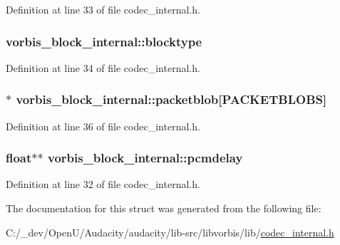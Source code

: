 Definition at line 33 of file codec\+\_\+internal.\+h.

\subsubsection[{\texorpdfstring{blocktype}{blocktype}}]{ vorbis\+\_\+block\+\_\+internal\+::blocktype}\hypertarget{structvorbis__block__internal_a4e3ca80a917072fbbe17dd5bd23f96ed}{}\label{structvorbis__block__internal_a4e3ca80a917072fbbe17dd5bd23f96ed}


Definition at line 34 of file codec\+\_\+internal.\+h.

\subsubsection[{\texorpdfstring{packetblob}{packetblob}}]{$\ast$ vorbis\+\_\+block\+\_\+internal\+::packetblob\mbox{[}{\bf P\+A\+C\+K\+E\+T\+B\+L\+O\+BS}\mbox{]}}\hypertarget{structvorbis__block__internal_a7b98d48f2d7a3305005d0513a7698218}{}\label{structvorbis__block__internal_a7b98d48f2d7a3305005d0513a7698218}


Definition at line 36 of file codec\+\_\+internal.\+h.

\subsubsection[{\texorpdfstring{pcmdelay}{pcmdelay}}]{\setlength{\rightskip}{0pt plus 5cm}float$\ast$$\ast$ vorbis\+\_\+block\+\_\+internal\+::pcmdelay}\hypertarget{structvorbis__block__internal_a6a650f039d0b3c0b320c8bf5e198547a}{}\label{structvorbis__block__internal_a6a650f039d0b3c0b320c8bf5e198547a}


Definition at line 32 of file codec\+\_\+internal.\+h.



The documentation for this struct was generated from the following file\+:\begin{DoxyCompactItemize}
\item 
C\+:/\+\_\+dev/\+Open\+U/\+Audacity/audacity/lib-\/src/libvorbis/lib/\hyperlink{codec__internal_8h}{codec\+\_\+internal.\+h}\end{DoxyCompactItemize}
